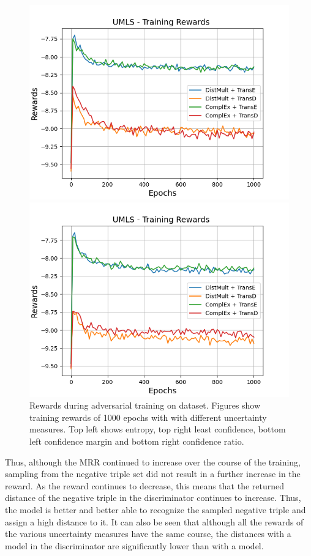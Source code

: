 \begin{figure}[H]
    \begin{minipage}{.5\textwidth}
      \centering
      \includegraphics[width=0.9\linewidth]{figures/results/gan_train/not_pretrained/uncertainty/max_distribution/confidence_margin/umls/uncertainty_umls_rew.png}
    \end{minipage}%
    \begin{minipage}{.5\textwidth}
      \centering
      \includegraphics[width=0.9\linewidth]{figures/results/gan_train/not_pretrained/uncertainty/max_distribution/confidence_ratio/umls/uncertainty_umls_rew.png}
    \end{minipage}%
    \caption{Rewards during adversarial training on \umls dataset. 
    Figures show training rewards of 1000 epochs with \ussoftmax with different uncertainty measures.
    Top left shows entropy, top right least confidence, 
    bottom left confidence margin and bottom right confidence ratio.}
    \label{fig:advtrain_metrics_umls_rew}
\end{figure}
Thus, although the MRR continued to increase over the course of the training, sampling from the negative triple set did not result in a further increase in the reward.
As the reward continues to decrease, this means that the returned distance of the negative triple in the discriminator continues to increase.
Thus, the model is better and better able to recognize the sampled negative triple and assign a high distance to it.
It can also be seen that although all the rewards of the various uncertainty measures have the same course, the distances with a \transd model in the discriminator are significantly lower than with a \transe model.
